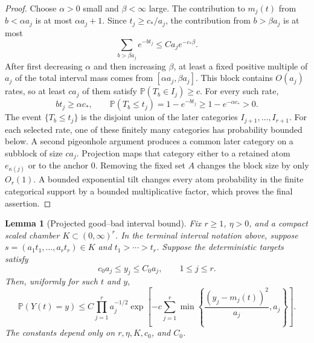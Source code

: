 \documentclass[11pt]{article}
\newtheorem{lemma}[theorem]{Lemma}
\theoremstyle{remark}
\newcommand{\Pp}{\mathbb P}
\begin{document}
\begin{proof}
Choose \(\alpha>0\) small and \(\beta<\infty\) large.  The contribution to
\(m_j(t)\) from \(b<\alpha a_j\) is at most \(\alpha a_j+1\).  Since
\(t_j\ge c_*/a_j\), the contribution from \(b>\beta a_j\) is at most
\[
        \sum_{b>\beta a_j}e^{-bt_j}
        \le C a_j e^{-c_*\beta}.
\]
After first decreasing \(\alpha\) and then increasing \(\beta\), at least a
fixed positive multiple of \(a_j\) of the total interval mass comes from
\([\alpha a_j,\beta a_j]\).  This block contains \(O(a_j)\) rates, so at
least \(ca_j\) of them satisfy \(\Pp(T_b\in I_j)\ge c\).  For every such
rate,
\[
        bt_j\ge\alpha c_*,
        \qquad
        \Pp(T_b\le t_j)=1-e^{-bt_j}\ge1-e^{-\alpha c_*}>0.
\]
The event \(\{T_b\le t_j\}\) is the disjoint union of the later categories
\(I_{j+1},\ldots,I_{r+1}\).  For each selected rate, one of these finitely
many categories has probability bounded below.  A second pigeonhole argument
produces a common later category on a subblock of size \(ca_j\).  Projection
maps that category either to a retained atom \(e_{\kappa(j)}\) or to the anchor
\(0\).  Removing the fixed set \(A\) changes the block size by only \(O_r(1)\).
A bounded exponential tilt changes every atom probability in the finite
categorical support by a bounded multiplicative factor, which proves the final
assertion.
\end{proof}

\begin{lemma}[Projected good--bad interval bound]\label{lem:projected-good-bad-interval-bound}
Fix $r\ge1$, $\eta>0$, and a compact scaled chamber
$K\subset(0,\infty)^r$.  In the terminal interval notation above, suppose
$s=(a_1t_1,\ldots,a_rt_r)\in K$ and $t_1>\cdots>t_r$.  Suppose the deterministic targets satisfy
\[
        c_0a_j\le y_j\le C_0a_j,
        \qquad 1\le j\le r .
\]
Then, uniformly for such $t$ and $y$,
\[
        \Pp(Y(t)=y)
        \le C\prod_{j=1}^r a_j^{-1/2}
        \exp\left[-c\sum_{j=1}^r
        \min\left\{\frac{(y_j-m_j(t))^2}{a_j},a_j\right\}\right].
\]
The constants depend only on $r,\eta,K,c_0$, and $C_0$.
\end{lemma}
\end{document}
